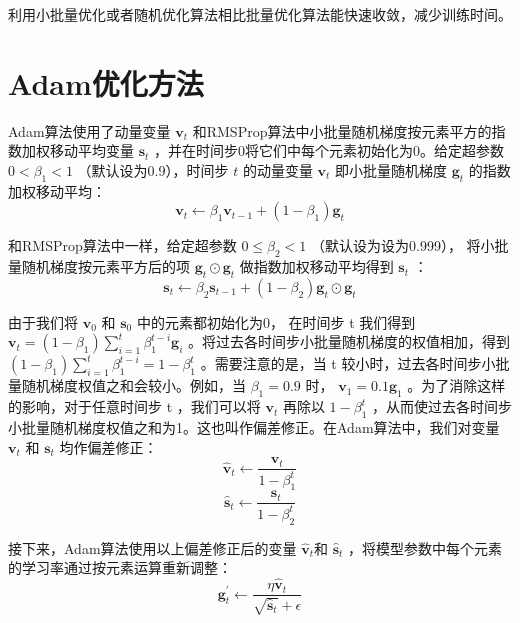 \documentclass[UTF-8]{progbookcn}
\begin{document}
\begin{information}
利用小批量优化或者随机优化算法相比批量优化算法能快速收敛，减少训练时间。
\end{information}



\section{Adam优化方法}
Adam算法使用了动量变量 $\bm{v}_t$ \cite{DBLP:journals/nn/Qian99}和RMSProp算法中小批量随机梯度按元素平方的指数加权移动平均变量 $\bm{s}_t$ \cite{DBLP:journals/corr/abs-1708-01911}，并在时间步0将它们中每个元素初始化为0\cite{DBLP:journals/corr/KingmaB14}。给定超参数 $0<\beta_1<1$ （默认设为0.9），时间步 $t$ 的动量变量 $\bm{v}_t$ 即小批量随机梯度 $\bm{g}_t$ 的指数加权移动平均：
\begin{equation}\label{E:Adam1}
  \bm{v}_t←\beta_1\bm{v}_{t−1}+(1−\beta_1)\bm{g}_t
\end{equation}

和RMSProp算法中一样，给定超参数 $0\leq \beta_2<1$ （默认设为设为0.999）， 将小批量随机梯度按元素平方后的项 $\bm{g}_t\odot \bm{g}_t$ 做指数加权移动平均得到 $\bm{s}_t$ ：
\begin{equation}\label{E:Adam2}
  \bm{s}_t←\beta_2\bm{s}_{t−1}+(1−\beta_2)\bm{g}_t\odot \bm{g}_t
\end{equation}


由于我们将 $\bm{v}_0$ 和 $\bm{s}_0$ 中的元素都初始化为0， 在时间步 t 我们得到 $\bm{v}_t=(1−\beta_1)\sum^{t}_{i=1}\beta_1^{t-i}\bm{g}_i$ 。将过去各时间步小批量随机梯度的权值相加，得到 $(1−\beta_1) \sum_{i=1}^t  \beta^{t−i}_1=1−\beta^t_1$  。需要注意的是，当 t 较小时，过去各时间步小批量随机梯度权值之和会较小。例如，当 $\beta_1=0.9$ 时， $\bm{v}_1=0.1\bm{g}_1$ 。为了消除这样的影响，对于任意时间步 t ，我们可以将 $\bm{v}_t$ 再除以 $1−\beta^t_1$ ，从而使过去各时间步小批量随机梯度权值之和为1。这也叫作偏差修正。在Adam算法中，我们对变量 $\bm{v}_t$ 和 $\bm{s}_t$ 均作偏差修正：
\begin{equation}\label{E:Adam3}
  \bm{\hat{v}}_t←\frac{\bm{v}_t}{1−\beta^t_1}
\end{equation}
\begin{equation}\label{E:Adam4}
  \bm{\hat{s}}_t←\frac{\bm{s}_t}{1−\beta^t_2}
\end{equation}



接下来，Adam算法使用以上偏差修正后的变量 $\bm{\hat{v}}_t$和 $\bm{\hat{s}}_t$ ，将模型参数中每个元素的学习率通过按元素运算重新调整：
\begin{equation}\label{E:Adam5}
  \bm{g}^′_t←\frac{\eta\bm{\hat{v}}_t}{\sqrt{\bm{\hat{s}}_t}+\epsilon}
\end{equation}
\end{document}
